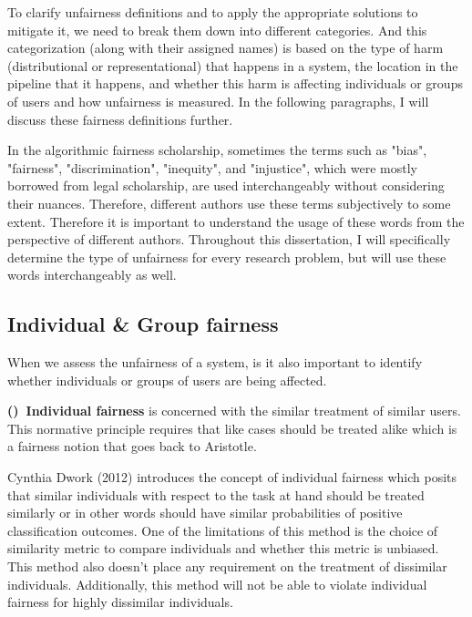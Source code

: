     To clarify unfairness definitions and to apply the appropriate solutions to mitigate it, we need to break them down into different categories. And this categorization (along with their assigned names) is based on the type of harm (distributional or representational) that happens in a system, the location in the pipeline that it happens, and whether this harm is affecting individuals or groups of users and how unfairness is measured. In the following paragraphs, I will discuss these fairness definitions further.

    In the algorithmic fairness scholarship, sometimes the terms such as "bias", "fairness", "discrimination", "inequity", and "injustice", which were mostly borrowed from legal scholarship, are used interchangeably without considering their nuances. Therefore, different authors use these terms subjectively to some extent. Therefore it is important to understand the usage of these words from the perspective of different authors. Throughout this dissertation, I will specifically determine the type of unfairness for every research problem, but will use these words interchangeably as well.
    
    \subsection{Individual \& Group fairness}
        
        When we assess the unfairness of a system, is it also important to identify whether individuals or groups of users are being affected. 
        
        \textbf{()~Individual fairness} is concerned with the similar treatment of similar users. This normative principle requires that like cases should be treated alike \cite{binns2020conflict} which is a fairness notion that goes back to Aristotle.
        
        Cynthia Dwork (2012) \cite{Dwork2012individual} introduces the concept of individual fairness which posits that similar individuals with respect to the task at hand should be treated similarly or in other words should have similar probabilities of positive classification outcomes. One of the limitations of this method is the choice of similarity metric to compare individuals and whether this metric is unbiased. This method also doesn't place any requirement on the treatment of dissimilar individuals. Additionally, this method will not be able to violate individual fairness for highly dissimilar individuals. 

